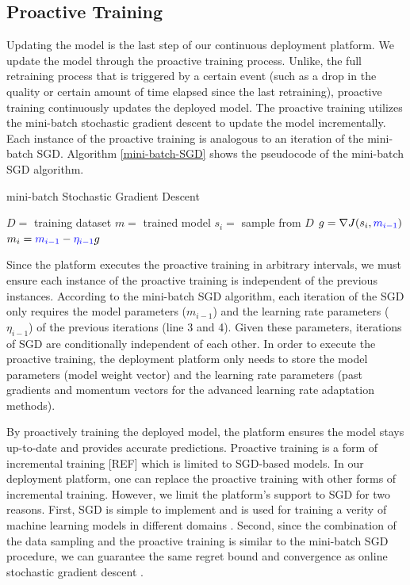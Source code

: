 \subsection{Proactive Training}\label{proactive-training}
Updating the model is the last step of our continuous deployment platform.
We update the model through the proactive training process.
Unlike, the full retraining process that is triggered by a certain event (such as a drop in the quality or certain amount of time elapsed since the last retraining), proactive training continuously updates the deployed model.
The proactive training utilizes the mini-batch stochastic gradient descent to update the model incrementally.
Each instance of the proactive training is analogous to an iteration of the mini-batch SGD.
Algorithm \ref{mini-batch-SGD} shows the pseudocode of the mini-batch SGD algorithm.
\begin{algorithm}
\caption{mini-batch Stochastic Gradient Descent}\label{mini-batch-SGD}
\begin{algorithmic}[1]
\Require  $D=$ training dataset
\Ensure $m=$ trained model
	\State $s_i =$ sample from $D$
	\State $g = \nabla J(s_i, \textcolor{blue}{m_{i-1}})$
	\State $m_i = \textcolor{blue}{m_{i-1}} - \textcolor{blue}{\eta_{i-1}}g$
\EndFor
\end{algorithmic}
\end{algorithm}

Since the platform executes the proactive training in arbitrary intervals, we must ensure each instance of the proactive training is independent of the previous instances.
According to the mini-batch SGD algorithm, each iteration of the SGD only requires the model parameters ($m_{i-1}$) and the learning rate parameters ($\eta_{i-1}$) of the previous iterations (line 3 and 4).
Given these parameters, iterations of SGD are conditionally independent of each other.
In order to execute the proactive training, the deployment platform only needs to store the model parameters (model weight vector) and the learning rate parameters (past gradients and momentum vectors for the advanced learning rate adaptation methods).

By proactively training the deployed model, the platform ensures the model stays up-to-date and provides accurate predictions.
Proactive training is a form of incremental training [REF] which is limited to SGD-based models.
In our deployment platform, one can replace the proactive training with other forms of incremental training.
However, we limit the platform's support to SGD for two reasons.
First, SGD is simple to implement and is used for training a verity of machine learning models in different domains \cite{ macmahan2013, bottou1995convergence, koren2009matrix,  funk2006netflix}. 
Second, since the combination of the data sampling and the proactive training is similar to the mini-batch SGD procedure, we can guarantee the same regret bound and convergence as online stochastic gradient descent \cite{zhang2004solving}.

